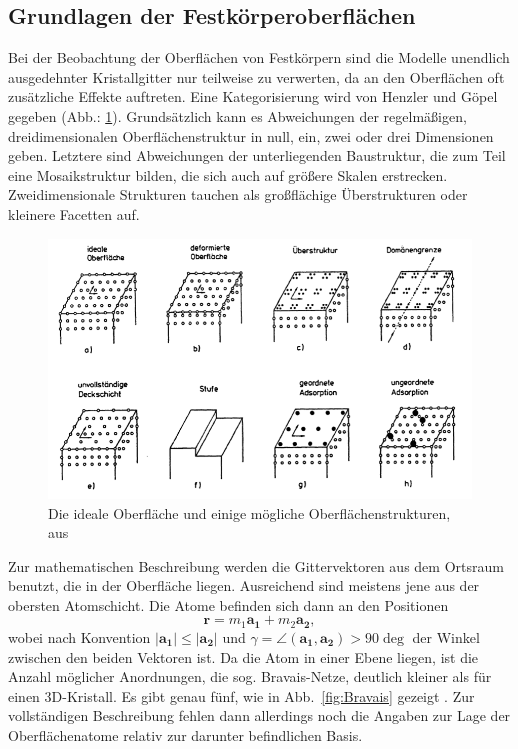 \subsection{Grundlagen der Festkörperoberflächen}
Bei der Beobachtung der Oberflächen von Festkörpern sind die Modelle unendlich 
ausgedehnter Kristallgitter nur teilweise zu verwerten, da an den Oberflächen 
oft zusätzliche Effekte auftreten. Eine Kategorisierung wird von Henzler und 
Göpel \cite{henzler1991oberflachenphysik} gegeben (Abb.: \ref{fig:oberflaeche}).
Grundsätzlich kann es Abweichungen der regelmäßigen, dreidimensionalen 
Oberflächenstruktur in null, ein, zwei oder drei Dimensionen geben. Letztere 
sind Abweichungen der unterliegenden Baustruktur, die zum Teil eine Mosaikstruktur 
bilden, die sich auch auf größere Skalen erstrecken. Zweidimensionale Strukturen 
tauchen als großflächige Überstrukturen oder kleinere Facetten auf. 

\begin{figure}
    \includegraphics[width=1.0\textwidth]{pics_theo/oberflaechenstruktur}
    \caption{Die ideale Oberfläche und einige mögliche Oberflächenstrukturen, 
aus \cite{henzler1991oberflachenphysik} }
    \label{fig:oberflaeche}
\end{figure} 

Zur mathematischen Beschreibung werden die Gittervektoren aus dem Ortsraum benutzt, 
die in der Oberfläche liegen. Ausreichend sind meistens jene aus der obersten 
Atomschicht. Die Atome befinden sich dann an den Positionen 
\begin{equation}
    \mathbf{r} = m_1 \mathbf{a_1} + m_2 \mathbf{a_2},
\end{equation}
wobei nach Konvention $|\mathbf{a_1}| \le |\mathbf{a_2}|$ und 
$\gamma = \angle (\mathbf{a_1}, \mathbf{a_2}) > 90 \deg$ der Winkel zwischen den 
beiden Vektoren ist. Da die Atom in einer Ebene liegen, ist die Anzahl möglicher 
Anordnungen, die sog. Bravais-Netze, deutlich kleiner als für einen 3D-Kristall. 
Es gibt genau fünf, wie in Abb.~\ref{fig:Bravais} gezeigt 
\cite{henzler1991oberflachenphysik}.
Zur vollständigen Beschreibung fehlen dann allerdings noch die Angaben zur Lage 
der Oberflächenatome relativ zur darunter befindlichen Basis. 

